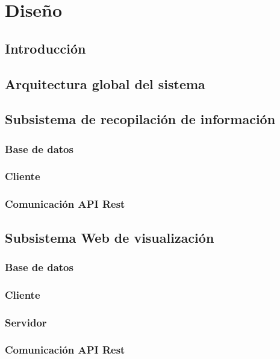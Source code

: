 \section{Diseño}

\subsection{Introducción}

\subsection{Arquitectura global del sistema}

\subsection{Subsistema de recopilación de información}
	\subsubsection{Base de datos}
	\subsubsection{Cliente}
	\subsubsection{Comunicación API Rest}
 
\subsection{Subsistema Web de visualización}
	\subsubsection{Base de datos}
	\subsubsection{Cliente}
	\subsubsection{Servidor}
	\subsubsection{Comunicación API Rest}
	
\newpage


